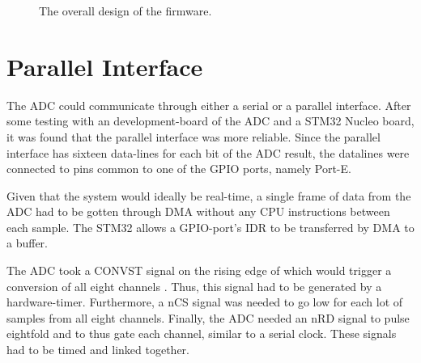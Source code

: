 \documentclass[notitlepage]{report}
\begin{document}
\begin{figure}[H]
\centering
\caption{The overall design of the firmware.}
\label{fig:firmware_overall}
\centering
\end{figure}

\section{Parallel Interface}

The ADC could communicate through either a serial or a parallel interface. After some testing with an development-board of the ADC and a STM32 Nucleo board, it was found that the parallel interface was more reliable. Since the parallel interface has sixteen data-lines for each bit of the ADC result, the datalines were connected to pins common to one of the GPIO ports, namely Port-E.

Given that the system would ideally be real-time, a single frame of data from the ADC had to be gotten through DMA without any CPU instructions between each sample. The STM32 allows a GPIO-port's IDR to be transferred by DMA to a buffer.

The ADC took a CONVST signal on the rising edge of which would trigger a conversion of all eight channels \cite{noauthor_8-channel_2021}. Thus, this signal had to be generated by a hardware-timer. Furthermore, a nCS signal was needed to go low for each lot of samples from all eight channels. Finally, the ADC needed an nRD signal to pulse eightfold and to thus gate each channel, similar to a serial clock. These signals had to be timed and linked together. 
\end{document}
